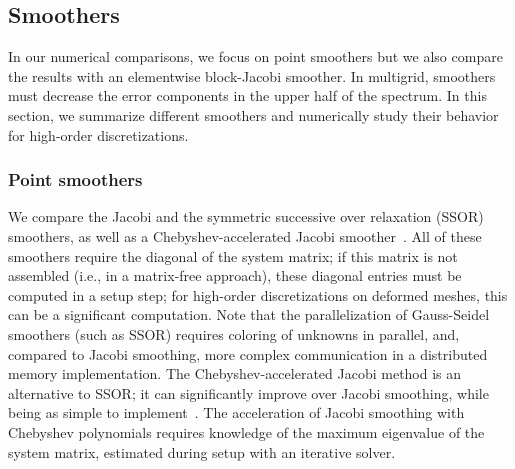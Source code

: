 \documentclass[smallcondensed,final]{svjour3}     %
\begin{document}




\subsection{Smoothers}\label{subsec:smoothers}
In our numerical comparisons, we focus on point smoothers but we also compare
the results with an elementwise block-Jacobi smoother. In multigrid,
smoothers must decrease the error components in the
upper half of the spectrum.  In this section, we summarize different
smoothers and numerically study their behavior for high-order
discretizations.

\subsubsection{Point smoothers}
We compare the Jacobi and the symmetric successive over
relaxation (SSOR) smoothers, as well as a Chebyshev-accelerated Jacobi
smoother~\cite{Brandt77}. All of these smoothers require the diagonal of the
system matrix; if this matrix is not  assembled (i.e., in a matrix-free approach),
these diagonal entries must be computed in a setup step; for high-order discretizations on deformed meshes, this can be a significant computation.  Note that the
parallelization of Gauss-Seidel smoothers (such as SSOR) requires coloring of
unknowns in parallel, and, compared to Jacobi smoothing, more
complex communication in a distributed memory implementation. The
Chebyshev-accelerated Jacobi method is an alternative to SSOR; it
can significantly improve over Jacobi smoothing, while being as simple to
implement~\cite{AdamsBrezinaHuEtAl03}. The acceleration of Jacobi smoothing
with Chebyshev polynomials requires knowledge of the maximum eigenvalue of
the system matrix, estimated during setup with an iterative solver.
\end{document}
